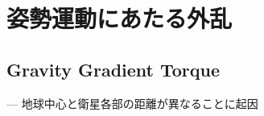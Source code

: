 \documentclass[class=article, crop=false, dvipdfmx, fleqn]{standalone}
\begin{document}
\section{姿勢運動にあたる外乱}
\subsection{Gravity Gradient Torque}
\qquad\qquad --- 地球中心と衛星各部の距離が異なることに起因

\begin{minipage}{0.45\linewidth}

\end{minipage}\hspace{15zw}
\begin{minipage}{0.4\linewidth}

\end{minipage}
\end{document}
